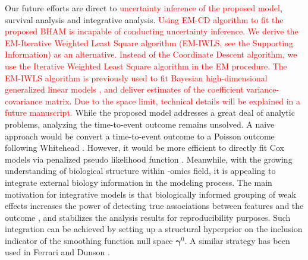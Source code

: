 \documentclass[AMA,STIX1COL,]{WileyNJD-v2}
\begin{document}
Our future efforts are direct to
\textcolor{red}{uncertainty inference of the proposed model}, survival
analysis and integrative analysis.
\textcolor{red}{Using EM-CD algorithm to fit the proposed BHAM is incapable of conducting uncertainty inference. We derive the EM-Iterative Weighted Least Square algorithm (EM-IWLS, see the Supporting Information) as an alternative. Instead of the Coordinate Descent algorithm, we use the Iterative Weighted Least Square algorithm in the EM procedure. The EM-IWLS algorithm is previously used to fit Bayesian high-dimensional generalized linear models \cite{Yi2012}, and deliver estimates of the coefficient variance-covariance matrix. Due to the space limit, technical details will be explained in a future manuscript.}
While the proposed model addresses a great deal of analytic problems,
analyzing the time-to-event outcome remains unsolved. A naive approach
would be convert a time-to-event outcome to a Poisson outcome following
Whitehead \citep{Whitehead1980}. However, it would be more efficient to
directly fit Cox models via penalized pseudo likelihood function
\citep{Simon2011}. Meanwhile, with the growing understanding of
biological structure within -omics field, it is appealing to integrate
external biology information in the modeling process. The main
motivation for integrative models is that biologically informed grouping
of weak effects increases the power of detecting true associations
between features and the outcome \citep{Peterson2016}, and stabilizes
the analysis results for reproducibility purposes. Such integration can
be achieved by setting up a structural hyperprior on the inclusion
indicator of the smoothing function null space
\(\boldsymbol{\gamma}^0\). A similar strategy has been used in Ferrari
and Dunson \citep{Ferrari2020}.

\clearpage



\clearpage
\end{document}
